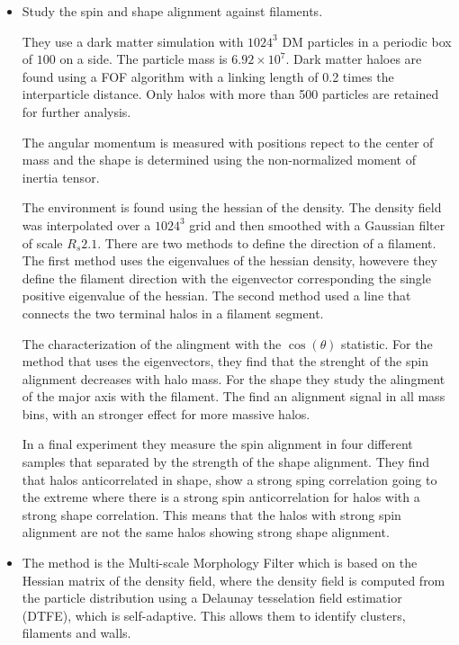 \documentclass[usenatbib]{mn2e}
\newcommand{\hMpc}{{\ifmmode{h^{-1}{\rm Mpc}}\else{$h^{-1}$Mpc }\fi}}
\newcommand{\hMsun}{{\ifmmode{h^{-1}{\rm {M_{\odot}}}}\else{$h^{-1}{\rm{M_{\odot}}}$}\fi}}
\begin{document}
\begin{itemize}
\item
\citep{Zhang2009}
Study the spin and shape alignment against filaments. 

They use a dark matter simulation with $1024^3$ DM particles in a
periodic box of $100$ \hMpc on a side. The particle mass is
$6.92\times10^{7}$\hMsun. Dark matter haloes are found using a FOF
algorithm with a linking length of 0.2 times the interparticle
distance. Only halos with more than 500 particles are retained for
further analysis. 

The angular momentum is measured with positions repect to the center
of mass and the shape is determined using the non-normalized moment of
inertia tensor.

The environment is found using the hessian of the density. The density
field was interpolated over a $1024^3$ grid and then smoothed with a
Gaussian filter of scale $R_{s}2.1$\hMpc. There are two methods to
define the direction of a filament. The first method uses the
eigenvalues of the hessian density, howevere they define the filament
direction with the eigenvector corresponding the single positive
eigenvalue of the hessian. The second method used a line that
connects the two terminal halos in a filament segment.


The characterization of the alingment with the $\cos(\theta)$
statistic. For the method that uses the eigenvectors, they find that
the strenght of the spin alignment decreases with halo mass. For the
shape they study the alingment of the major axis with the
filament. The find an alignment signal in all mass bins, with an stronger
effect for more massive halos. 

In a final experiment they measure the spin alignment in four
different samples that separated by the strength of the shape
alignment. They find that halos anticorrelated in shape, show a strong
sping correlation going to the extreme where there is a strong spin
anticorrelation for halos with a strong shape correlation. This means
that the halos with strong spin alignment are not the same halos
showing strong shape alignment. 


\item 
\citep{AragonCalvo2007} %
The method is the Multi-scale Morphology Filter which is based on the
Hessian matrix of the density field, where the density field is
computed from the particle distribution using a Delaunay tesselation
field estimatior (DTFE), which is self-adaptive. This allows them to
identify clusters, filaments and walls.



\end{itemize}
\end{document}

